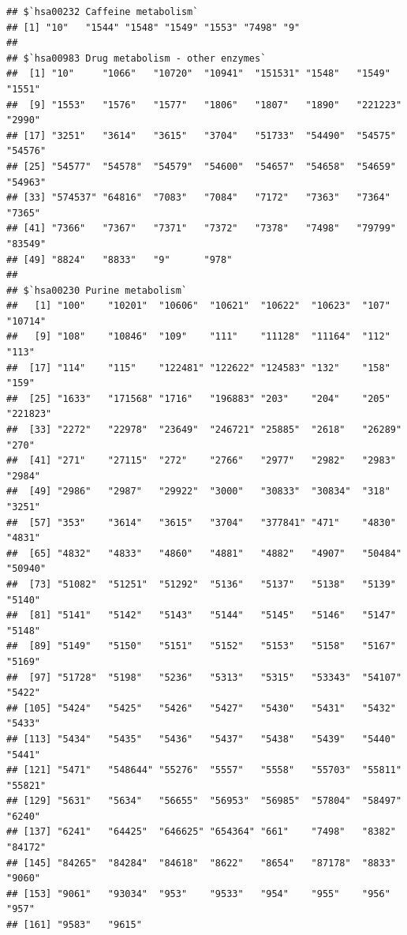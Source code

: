 \documentclass[
]{article}
\newenvironment{Shaded}{\begin{snugshade}}{\end{snugshade}}
\newcommand{\FunctionTok}[1]{\textcolor[rgb]{0.00,0.00,0.00}{#1}}
\newcommand{\NormalTok}[1]{#1}
\newcommand{\OtherTok}[1]{\textcolor[rgb]{0.56,0.35,0.01}{#1}}
\newcommand{\SpecialCharTok}[1]{\textcolor[rgb]{0.00,0.00,0.00}{#1}}
\begin{document}
\begin{verbatim}
## $`hsa00232 Caffeine metabolism`
## [1] "10"   "1544" "1548" "1549" "1553" "7498" "9"   
## 
## $`hsa00983 Drug metabolism - other enzymes`
##  [1] "10"     "1066"   "10720"  "10941"  "151531" "1548"   "1549"   "1551"  
##  [9] "1553"   "1576"   "1577"   "1806"   "1807"   "1890"   "221223" "2990"  
## [17] "3251"   "3614"   "3615"   "3704"   "51733"  "54490"  "54575"  "54576" 
## [25] "54577"  "54578"  "54579"  "54600"  "54657"  "54658"  "54659"  "54963" 
## [33] "574537" "64816"  "7083"   "7084"   "7172"   "7363"   "7364"   "7365"  
## [41] "7366"   "7367"   "7371"   "7372"   "7378"   "7498"   "79799"  "83549" 
## [49] "8824"   "8833"   "9"      "978"   
## 
## $`hsa00230 Purine metabolism`
##   [1] "100"    "10201"  "10606"  "10621"  "10622"  "10623"  "107"    "10714" 
##   [9] "108"    "10846"  "109"    "111"    "11128"  "11164"  "112"    "113"   
##  [17] "114"    "115"    "122481" "122622" "124583" "132"    "158"    "159"   
##  [25] "1633"   "171568" "1716"   "196883" "203"    "204"    "205"    "221823"
##  [33] "2272"   "22978"  "23649"  "246721" "25885"  "2618"   "26289"  "270"   
##  [41] "271"    "27115"  "272"    "2766"   "2977"   "2982"   "2983"   "2984"  
##  [49] "2986"   "2987"   "29922"  "3000"   "30833"  "30834"  "318"    "3251"  
##  [57] "353"    "3614"   "3615"   "3704"   "377841" "471"    "4830"   "4831"  
##  [65] "4832"   "4833"   "4860"   "4881"   "4882"   "4907"   "50484"  "50940" 
##  [73] "51082"  "51251"  "51292"  "5136"   "5137"   "5138"   "5139"   "5140"  
##  [81] "5141"   "5142"   "5143"   "5144"   "5145"   "5146"   "5147"   "5148"  
##  [89] "5149"   "5150"   "5151"   "5152"   "5153"   "5158"   "5167"   "5169"  
##  [97] "51728"  "5198"   "5236"   "5313"   "5315"   "53343"  "54107"  "5422"  
## [105] "5424"   "5425"   "5426"   "5427"   "5430"   "5431"   "5432"   "5433"  
## [113] "5434"   "5435"   "5436"   "5437"   "5438"   "5439"   "5440"   "5441"  
## [121] "5471"   "548644" "55276"  "5557"   "5558"   "55703"  "55811"  "55821" 
## [129] "5631"   "5634"   "56655"  "56953"  "56985"  "57804"  "58497"  "6240"  
## [137] "6241"   "64425"  "646625" "654364" "661"    "7498"   "8382"   "84172" 
## [145] "84265"  "84284"  "84618"  "8622"   "8654"   "87178"  "8833"   "9060"  
## [153] "9061"   "93034"  "953"    "9533"   "954"    "955"    "956"    "957"   
## [161] "9583"   "9615"
\end{verbatim}

\begin{Shaded}
\end{Shaded}
\end{document}
